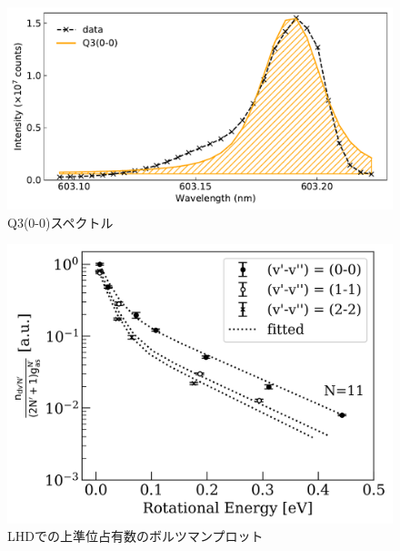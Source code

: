 \begin{figure}
    \centering
    \includegraphics[width=15cm]{pictures/voigt-fitting-3.pdf}
    \caption{Q3(0-0)スペクトル}
    \label{fig:voigt-fitting-3}
\end{figure}

\begin{figure}
    \centering
    \includegraphics[width=15cm]{pictures/ishihara-upper-boltzmann.png}
    \caption{LHDでの上準位占有数のボルツマンプロット}
    \label{fig:ishihara-upper-boltzmann}
\end{figure}
